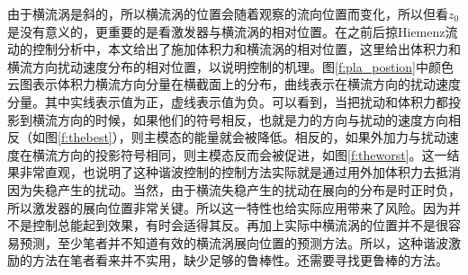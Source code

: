 由于横流涡是斜的，所以横流涡的位置会随着观察的流向位置而变化，所以但看$z_0$是没有意义的，更重要的是看激发器与横流涡的相对位置。在之前后掠Hiemenz流动的控制分析中，本文给出了施加体积力和横流涡的相对位置，这里给出体积力和横流方向扰动速度分布的相对位置，以说明控制的机理。图\ref{f:pla_postion}中颜色云图表示体积力横流方向分量在横截面上的分布，曲线表示在横流方向的扰动速度分量。其中实线表示值为正，虚线表示值为负。可以看到，当把扰动和体积力都投影到横流方向的时候，如果他们的符号相反，也就是力的方向与扰动的速度方向相反（如图\ref{f:thebest}），则主模态的能量就会被降低。相反的，如果外加力与扰动速度在横流方向的投影符号相同，则主模态反而会被促进，如图\ref{f:theworst}。这一结果非常直观，也说明了这种谐波控制的控制方法实际就是通过用外加体积力去抵消因为失稳产生的扰动。当然，由于横流失稳产生的扰动在展向的分布是时正时负，所以激发器的展向位置非常关键。所以这一特性也给实际应用带来了风险。因为并不是控制总能起到效果，有时会适得其反。再加上实际中横流涡的位置并不是很容易预测，至少笔者并不知道有效的横流涡展向位置的预测方法。所以，这种谐波激励的方法在笔者看来并不实用，缺少足够的鲁棒性。还需要寻找更鲁棒的方法。

